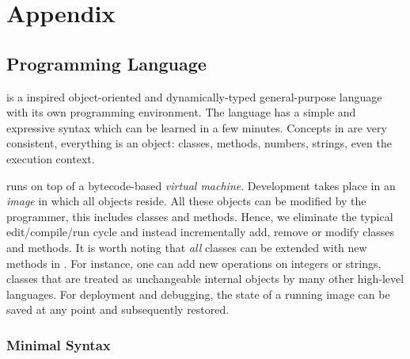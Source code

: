 
\chapter{Appendix}


\vspace*{5cm}
\section{\PH Programming Language}


\PH is a \ST inspired object-oriented and dynamically-typed general-purpose language with its own programming environment.
The language has a simple and expressive syntax which can be learned in a few minutes.
Concepts in \PH are very consistent, everything is an object: classes, methods, numbers, strings, even the execution context.

\PH runs on top of a bytecode-based \emph{virtual machine}.
Development takes place in an \emph{image} in which all objects reside.
All these objects can be modified by the programmer, this includes classes and methods.
Hence, we eliminate the typical edit/compile/run cycle and instead incrementally add, remove or modify classes and methods.
It is worth noting that \emph{all} classes can be extended with new methods in \PH.
For instance, one can add new operations on integers or strings, classes that are treated as unchangeable internal objects by many other high-level languages.
For deployment and debugging, the state of a running image can be saved at any point and subsequently restored.

\newpage

\subsection{Minimal Syntax}

